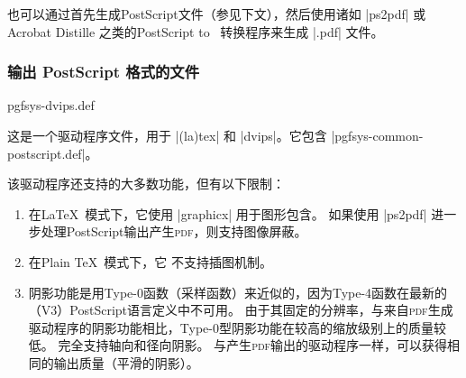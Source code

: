也可以通过首先生成PostScript文件（参见下文），然后使用诸如 |ps2pdf| 或Acrobat Distille 之类的PostScript to \pdf\ 转换程序来生成 |.pdf| 文件。


\subsubsection{输出 PostScript 格式的文件}

\begin{filedescription}{pgfsys-dvips.def}

    这是一个驱动程序文件，用于 |(la)tex| 和 |dvips|。它包含 |pgfsys-common-postscript.def|。


    该驱动程序还支持\pgfname 的大多数功能，但有以下限制：
    \begin{enumerate}
        \item 在\LaTeX\ 模式下，它使用 |graphicx| 用于图形包含。 如果使用 |ps2pdf| 进一步处理PostScript输出产生\textsc{pdf}，则支持图像屏蔽。
        \item 在Plain \TeX\ 模式下，它 不支持插图机制。
        \item 阴影功能是用Type-0函数（采样函数）来近似的，因为Type-4函数在最新的（V3）PostScript语言定义中不可用。 由于其固定的分辨率，与来自\textsc{pdf}生成驱动程序的阴影功能相比，Type-0型阴影功能在较高的缩放级别上的质量较低。 完全支持轴向和径向阴影。 与产生\textsc{pdf}输出的驱动程序一样，可以获得相同的输出质量（平滑的阴影）。
        

\end{enumerate}
\end{filedescription}
